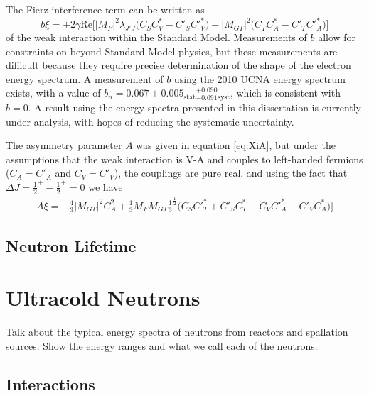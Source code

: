 The Fierz interference term can be written as
\begin{equation}
  b\xi = \pm 2\gamma \mathrm{Re}\bigg[|M_{F}|^2 \lambda_{J'J}\big(C_SC^*_V-C'_SC'^*_V \big) 
    + |M_{GT}|^2\big(C_TC^*_A-C'_TC'^*_A \big) \bigg]
  \label{eq:b}
\end{equation}
of the weak interaction within the Standard Model. Measurements of $b$ allow for constraints on
beyond Standard Model physics, but these measurements are difficult because they
require precise determination of the shape of the electron energy spectrum. A measurement of
$b$ using the 2010 UCNA energy spectrum exists, with a value of
$b_n = 0.067 \pm 0.005_{\mathrm{stat}}{}^{+ 0.090}_{-0.091}{}_{\mathrm{syst}}$, which is consistent with
$b=0$. A result using the energy
spectra presented in this dissertation is currently under analysis, with hopes of reducing the
systematic uncertainty.

The asymmetry parameter $A$ was given in equation \ref{eq:XiA}, but under the assumptions that the
weak interaction is V-A and couples to left-handed fermions ($C_A=C'_A$ and $C_V=C'_V$), the couplings
are pure real, and using the fact that
$\Delta J = {\frac{1}{2}}^+ - {\frac{1}{2}}^+ = 0$ we have
%
\begin{multline}
  A\xi = -\frac{4}{3} |M_{GT}|^2 C_A^2 
    + \frac{1}{3}M_FM_{GT}\frac{1}{3}^{\frac{1}{2}}\big(C_SC'^*_T+C'_SC^*_T -C_VC'^*_A-C'_VC^*_A \big) \bigg]
  \label{eq:XiA}
\end{multline}
%




\subsection{Neutron Lifetime}



\section{Ultracold Neutrons}

Talk about the typical energy spectra of neutrons from reactors and spallation sources. Show the
energy ranges and what we call each of the neutrons.

\subsection{Interactions}

